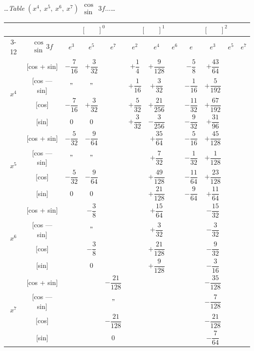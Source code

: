 \documentclass[10pt,a4paper]{article}
\newcommand{\tabletitle}[2]{%
  \begin{center}
  \ldots\textit{Table} #1 $\displaystyle\begin{smallmatrix} \cos \\ \sin \end{smallmatrix}$ #2\ldots
  \end{center}
}
\begin{document}
\newpage

\tabletitle{$(x^4,\ x^5,\ x^6,\ x^7)$}{$3f\ldots$}

\begin{center}
\small
\begin{tabular}{|c|c|c|c|c|c|c|c|c|c|c|c|}
\hline
& & \multicolumn{3}{c|}{$[\phantom{()}]^0$} & \multicolumn{3}{c|}{$[\phantom{()}]^1$} & \multicolumn{4}{c|}{$[\phantom{()}]^2$} \\
\cline{3-12}
& $\begin{smallmatrix} \cos \\ \sin \end{smallmatrix} 3f$ & $e^3$ & $e^5$ & $e^7$ & $e^2$ & $e^4$ & $e^6$ & $e$ & $e^3$ & $e^5$ & $e^7$ \\
\hline
\multirow{4}{*}{$x^4$} & [cos + sin] & $-\dfrac{7}{16}$ & $+\dfrac{3}{32}$ & & $+\dfrac{1}{4}$ & $+\dfrac{9}{128}$ & & $-\dfrac{5}{8}$ & $+\dfrac{43}{64}$ \\
& [cos --- sin] & $"$ & $"$ & & $+\dfrac{1}{16}$ & $+\dfrac{3}{32}$ & & $-\dfrac{1}{16}$ & $+\dfrac{5}{192}$ \\
& [cos] & $-\dfrac{7}{16}$ & $+\dfrac{3}{32}$ & & $+\dfrac{5}{32}$ & $+\dfrac{21}{256}$ & & $-\dfrac{11}{32}$ & $+\dfrac{67}{192}$ \\
& [sin] & $0$ & $0$ & & $+\dfrac{3}{32}$ & $-\dfrac{3}{256}$ & & $-\dfrac{9}{32}$ & $+\dfrac{31}{96}$ \\
\hline
\multirow{4}{*}{$x^5$} & [cos + sin] & $-\dfrac{5}{32}$ & $-\dfrac{9}{64}$ & & & $+\dfrac{35}{64}$ & & $-\dfrac{5}{16}$ & $+\dfrac{45}{128}$ \\
& [cos --- sin] & $"$ & $"$ & & & $+\dfrac{7}{32}$ & & $-\dfrac{1}{32}$ & $+\dfrac{1}{128}$ \\
& [cos] & $-\dfrac{5}{32}$ & $-\dfrac{9}{64}$ & & & $+\dfrac{49}{128}$ & & $-\dfrac{11}{64}$ & $+\dfrac{23}{128}$ \\
& [sin] & $0$ & $0$ & & & $+\dfrac{21}{128}$ & & $-\dfrac{9}{64}$ & $+\dfrac{11}{64}$ \\
\hline
\multirow{4}{*}{$x^6$} & [cos + sin] & & $-\dfrac{3}{8}$ & & & $+\dfrac{15}{64}$ & & & $-\dfrac{15}{32}$ \\
& [cos --- sin] & & $"$ & & & $+\dfrac{3}{32}$ & & & $-\dfrac{3}{32}$ \\
& [cos] & & $-\dfrac{3}{8}$ & & & $+\dfrac{21}{128}$ & & & $-\dfrac{9}{32}$ \\
& [sin] & & $0$ & & & $+\dfrac{9}{128}$ & & & $-\dfrac{3}{16}$ \\
\hline
\multirow{4}{*}{$x^7$} & [cos + sin] & & & $-\dfrac{21}{128}$ & & & & & $-\dfrac{35}{128}$ \\
& [cos --- sin] & & & $"$ & & & & & $-\dfrac{7}{128}$ \\
& [cos] & & & $-\dfrac{21}{128}$ & & & & & $-\dfrac{21}{128}$ \\
& [sin] & & & $0$ & & & & & $-\dfrac{7}{64}$ \\
\hline
\end{tabular}
\end{center}
\end{document}
